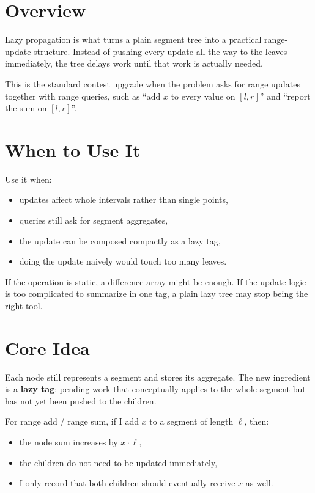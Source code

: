\section*{Overview}

Lazy propagation is what turns a plain segment tree into a practical range-update structure. Instead of pushing every
update all the way to the leaves immediately, the tree delays work until that work is actually needed.

This is the standard contest upgrade when the problem asks for range updates together with range queries, such as
``add \(x\) to every value on \([l, r]\)'' and ``report the sum on \([l, r]\)''.

\section*{When to Use It}

Use it when:

\begin{itemize}
  \item updates affect whole intervals rather than single points,
  \item queries still ask for segment aggregates,
  \item the update can be composed compactly as a lazy tag,
  \item doing the update naively would touch too many leaves.
\end{itemize}

If the operation is static, a difference array might be enough. If the update logic is too complicated to summarize in
one tag, a plain lazy tree may stop being the right tool.

\section*{Core Idea}

Each node still represents a segment and stores its aggregate. The new ingredient is a \textbf{lazy tag}: pending work
that conceptually applies to the whole segment but has not yet been pushed to the children.

For range add / range sum, if I add \(x\) to a segment of length \(\ell\), then:

\begin{itemize}
  \item the node sum increases by \(x \cdot \ell\),
  \item the children do not need to be updated immediately,
  \item I only record that both children should eventually receive \(x\) as well.
\end{itemize}

